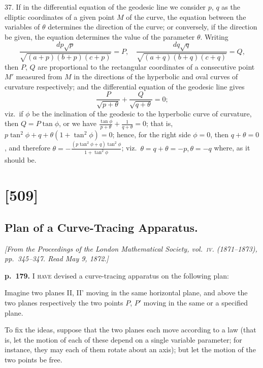 \documentclass[11pt,a4paper]{book}
\begin{document}
37. If in the differential equation of the geodesic line we consider $p$, $q$ as the elliptic coordinates of a given point $M$ of the curve, the equation between the variables of $\theta$ determines the direction of the curve; or conversely, if the direction be given, the equation determines the value of the parameter $\theta$.  Writing
\[
\frac{dp \sqrt{p}}{\sqrt{(a + p)(b + p)(c + p)}} = P, \quad \frac{dq \sqrt{q}}{\sqrt{(a + q)(b + q)(c + q)}} = Q,
\]
then $P$, $Q$ are proportional to the rectangular coordinates of a consecutive point $M'$ measured from $M$ in the directions of the hyperbolic and oval curves of curvature respectively; and the differential equation of the geodesic line gives
\[
\frac{P}{\sqrt{p + \theta}} + \frac{Q}{\sqrt{q + \theta}} = 0;
\]
viz.\ if $\phi$ be the inclination of the geodesic to the hyperbolic curve of curvature, then $Q = P \tan \phi$, or we have $\frac{\tan \phi}{p + \theta} + \frac{1}{q + \theta} = 0$; that is, $p \tan^2 \phi + q + \theta (1 + \tan^2 \phi) = 0$; hence, for the right side $\phi = 0$, then $q + \theta = 0$, and therefore $\theta = -\frac{(p \tan^2 \phi + q) \tan^2 \phi}{1 + \tan^2 \phi}$; viz.\ $\theta = q + \theta = -p, \theta = -q$ where, as it should be.

\clearpage

\section{[509]}
\subsection{Plan of a Curve-Tracing Apparatus.}

\begin{center}
\textit{[From the Proceedings of the London Mathematical Society, vol.\ \textsc{iv}. (1871--1873),
pp.\ 345--347.  Read May 9, 1872.]}
\end{center}

\noindent
\textbf{p.~179.}  \textsc{I have} devised a curve-tracing apparatus on the following plan:

Imagine two planes II, II' moving in the same horizontal plane, and above the
two planes respectively the two points $P$, $P'$ moving in the same or a specified plane.

To fix the ideas, suppose that the two planes each move according to a law (that
is, let the motion of each of these depend on a single variable parameter; for instance,
they may each of them rotate about an axis); but let the motion of the two points be
free.
\end{document}
